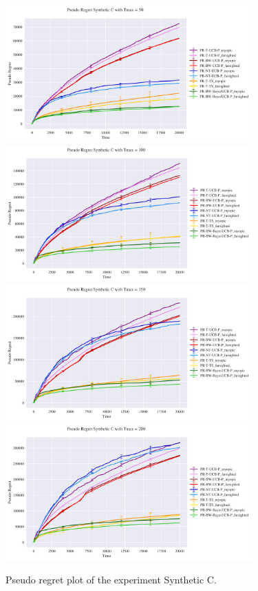 \begin{figure}[H]
	\centering
	\includegraphics[width=9.5cm]{./images/ANALYTICS/experiment_C_50 ANALYTICS.png}\quad\includegraphics[width=9.5cm]{./images/ANALYTICS/experiment_C_100 ANALYTICS.png}
	\includegraphics[width=9.5cm]{./images/ANALYTICS/experiment_C_150 ANALYTICS.png}\quad\includegraphics[width=9.5cm]{./images/ANALYTICS/experiment_C_200 ANALYTICS.png}
	\caption{Pseudo regret plot of the experiment Synthetic C.}
	
\end{figure}

